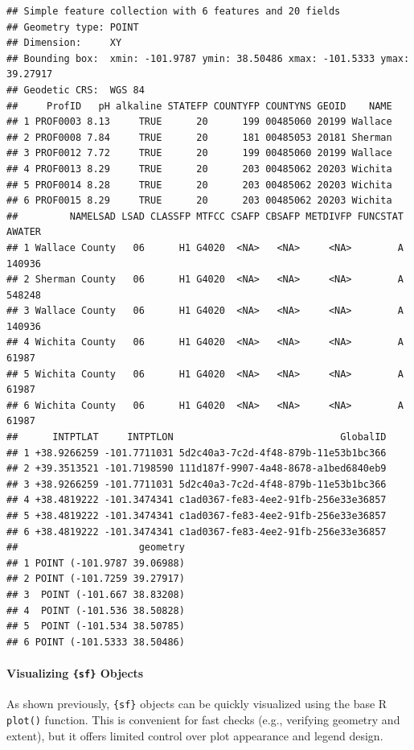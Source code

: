\documentclass[
  10pt,
  b5paper,
  oneside]{book}
\begin{document}
\begin{verbatim}
## Simple feature collection with 6 features and 20 fields
## Geometry type: POINT
## Dimension:     XY
## Bounding box:  xmin: -101.9787 ymin: 38.50486 xmax: -101.5333 ymax: 39.27917
## Geodetic CRS:  WGS 84
##     ProfID   pH alkaline STATEFP COUNTYFP COUNTYNS GEOID    NAME
## 1 PROF0003 8.13     TRUE      20      199 00485060 20199 Wallace
## 2 PROF0008 7.84     TRUE      20      181 00485053 20181 Sherman
## 3 PROF0012 7.72     TRUE      20      199 00485060 20199 Wallace
## 4 PROF0013 8.29     TRUE      20      203 00485062 20203 Wichita
## 5 PROF0014 8.28     TRUE      20      203 00485062 20203 Wichita
## 6 PROF0015 8.29     TRUE      20      203 00485062 20203 Wichita
##         NAMELSAD LSAD CLASSFP MTFCC CSAFP CBSAFP METDIVFP FUNCSTAT AWATER
## 1 Wallace County   06      H1 G4020  <NA>   <NA>     <NA>        A 140936
## 2 Sherman County   06      H1 G4020  <NA>   <NA>     <NA>        A 548248
## 3 Wallace County   06      H1 G4020  <NA>   <NA>     <NA>        A 140936
## 4 Wichita County   06      H1 G4020  <NA>   <NA>     <NA>        A  61987
## 5 Wichita County   06      H1 G4020  <NA>   <NA>     <NA>        A  61987
## 6 Wichita County   06      H1 G4020  <NA>   <NA>     <NA>        A  61987
##      INTPTLAT     INTPTLON                             GlobalID
## 1 +38.9266259 -101.7711031 5d2c40a3-7c2d-4f48-879b-11e53b1bc366
## 2 +39.3513521 -101.7198590 111d187f-9907-4a48-8678-a1bed6840eb9
## 3 +38.9266259 -101.7711031 5d2c40a3-7c2d-4f48-879b-11e53b1bc366
## 4 +38.4819222 -101.3474341 c1ad0367-fe83-4ee2-91fb-256e33e36857
## 5 +38.4819222 -101.3474341 c1ad0367-fe83-4ee2-91fb-256e33e36857
## 6 +38.4819222 -101.3474341 c1ad0367-fe83-4ee2-91fb-256e33e36857
##                     geometry
## 1 POINT (-101.9787 39.06988)
## 2 POINT (-101.7259 39.27917)
## 3  POINT (-101.667 38.83208)
## 4  POINT (-101.536 38.50828)
## 5  POINT (-101.534 38.50785)
## 6 POINT (-101.5333 38.50486)
\end{verbatim}

\paragraph*{\texorpdfstring{Visualizing \texttt{\{sf\}} Objects}{Visualizing \{sf\} Objects}}\label{visualizing-sf-objects}

As shown previously, \texttt{\{sf\}} objects can be quickly visualized using the base R \texttt{plot()} function. This is convenient for fast checks (e.g., verifying geometry and extent), but it offers limited control over plot appearance and legend design.
\end{document}
